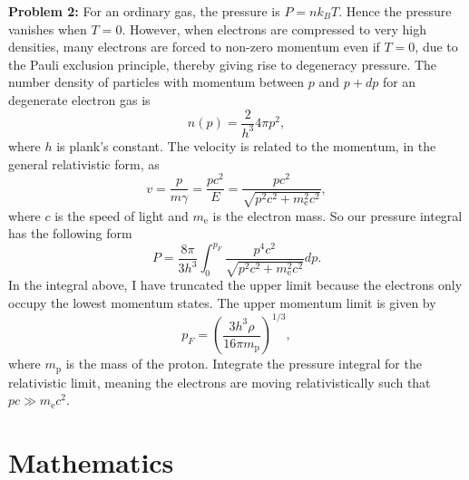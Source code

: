 \documentclass{article}
\begin{document}
\bigskip
\noindent
\textbf{Problem 2:}  For an ordinary gas, the pressure is $P=nk_BT$. Hence the pressure vanishes when $T=0$. However, when electrons are compressed to very high densities, many electrons are forced to non-zero momentum even if $T=0$, due to the Pauli exclusion principle, thereby giving rise to degeneracy pressure. The number density  of particles with momentum between $p$ and $p + dp$ for an degenerate electron gas is
\begin{equation*}
n(p) = \frac{2}{h^3}4\pi p^2,
\end{equation*}
where $h$ is plank's constant. The velocity is related to the momentum, in the general relativistic form, as
\begin{equation*}
v=\frac{p}{m\gamma} =\frac{pc^2}{E}=\frac{pc^2}{\sqrt{p^2c^2+m_\mathrm{e}^2c^2}},
\end{equation*}
where $c$ is the speed of light and $m_\mathrm{e}$ is the electron mass. So our pressure integral has the following form
\begin{equation*}
\label{Eq. Degenerate Pressure}
P = \frac{8\pi}{3h^3}\int_0^{p_F}\frac{p^4 c^2}{\sqrt{p^2 c^2+m_\mathrm{e}^2 c^2}}dp.
\end{equation*}
In the integral above, I have truncated the upper limit because the electrons only occupy the lowest momentum states. The upper momentum limit is given by
\begin{equation*}
p_F = \left(\frac{3h^3\rho}{16\pi m_\mathrm{p}}\right)^{1/3},
\end{equation*}
where $m_\mathrm{p}$ is the mass of the proton. Integrate the pressure integral for the relativistic limit, meaning the electrons are moving relativistically such that $pc \gg m_\mathrm{e}c^2$.



\section{Mathematics}
\end{document}
